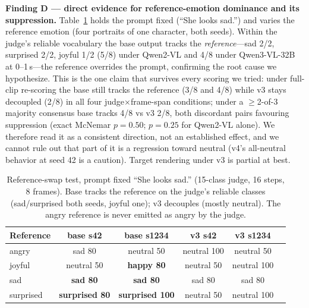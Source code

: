\documentclass[conference]{IEEEtran}
\begin{document}
\textbf{Finding D --- direct evidence for reference-emotion dominance and its suppression.}
Table~\ref{tab:mechanism} holds the prompt fixed (``She looks sad.'') and varies the reference
emotion (four portraits of one character, both seeds). Within the judge's reliable vocabulary the
base output tracks the \emph{reference}---sad 2/2, surprised 2/2, joyful 1/2 (5/8) under Qwen2-VL
and 4/8 under Qwen3-VL-32B at 0--1\,s---the reference overrides the prompt, confirming the root cause
we hypothesize. This is the one claim that survives every scoring we tried: under full-clip
re-scoring the base still tracks the reference (3/8 and 4/8) while v3 stays decoupled (2/8) in all
four judge$\times$frame-span conditions; under a $\ge$2-of-3 majority consensus base tracks 4/8 vs v3
2/8, both discordant pairs favouring suppression (exact McNemar $p{=}0.50$; $p{=}0.25$ for Qwen2-VL alone). We therefore read it as a consistent direction, not an
established effect, and we cannot rule out that part of it is a regression toward neutral (v4's
all-neutral behavior at seed 42 is a caution). Target rendering under v3 is partial at best.

\begin{table}[!t]
\centering\small
\caption{Reference-swap test, prompt fixed ``She looks sad.'' (15-class judge, 16 steps, 8
frames). Base tracks the reference on the judge's reliable classes (sad/surprised both seeds,
joyful one); v3 decouples (mostly neutral). The angry reference is never emitted as angry by the
judge.}
\label{tab:mechanism}
\begin{tabular}{@{}lccccc@{}}
\toprule
Reference & base s42 & base s1234 & v3 s42 & v3 s1234\\
\midrule
angry & sad 80 & neutral 50 & neutral 100 & neutral 50\\
joyful & neutral 50 & \textbf{happy 80} & neutral 50 & neutral 100\\
sad & \textbf{sad 80} & \textbf{sad 80} & sad 80 & sad 80\\
surprised & \textbf{surprised 80} & \textbf{surprised 100} & neutral 50 & neutral 100\\
\bottomrule
\end{tabular}
\end{table}
\end{document}
